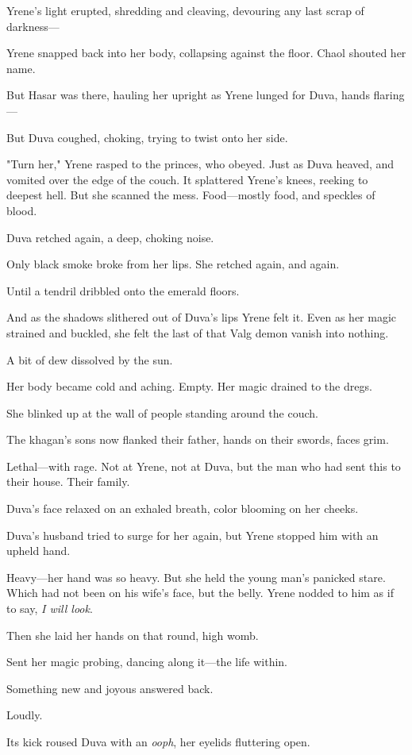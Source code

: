 Yrene's light erupted, shredding and cleaving, devouring any last scrap of darkness---

Yrene snapped back into her body, collapsing against the floor. Chaol shouted her name.

But Hasar was there, hauling her upright as Yrene lunged for Duva, hands flaring---

But Duva coughed, choking, trying to twist onto her side.

"Turn her," Yrene rasped to the princes, who obeyed. Just as Duva heaved, and vomited over the edge of the couch. It splattered Yrene's knees, reeking to deepest hell. But she scanned the mess. Food---mostly food, and speckles of blood.

Duva retched again, a deep, choking noise.

Only black smoke broke from her lips. She retched again, and again.

Until a tendril dribbled onto the emerald floors.

And as the shadows slithered out of Duva's lips  Yrene felt it. Even as her magic strained and buckled, she felt the last of that Valg demon vanish into nothing.

A bit of dew dissolved by the sun.

Her body became cold and aching. Empty. Her magic drained to the dregs.

She blinked up at the wall of people standing around the couch.

The khagan's sons now flanked their father, hands on their swords, faces grim.

Lethal---with rage. Not at Yrene, not at Duva, but the man who had sent this to their house. Their family.

Duva's face relaxed on an exhaled breath, color blooming on her cheeks.

Duva's husband tried to surge for her again, but Yrene stopped him with an upheld hand.

Heavy---her hand was so heavy. But she held the young man's panicked stare. Which had not been on his wife's face, but the belly. Yrene nodded to him as if to say, \emph{I will look}.

Then she laid her hands on that round, high womb.

Sent her magic probing, dancing along it---the life within.

Something new and joyous answered back.

Loudly.

Its kick roused Duva with an \emph{ooph}, her eyelids fluttering open.

